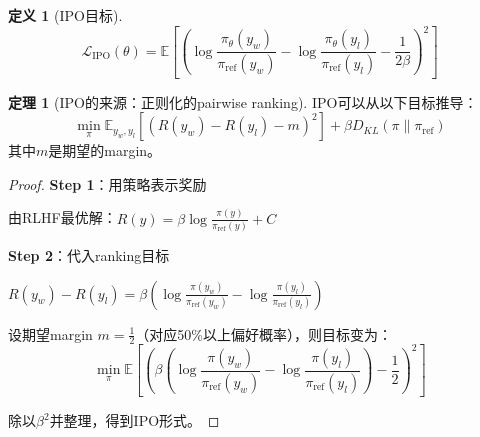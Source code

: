 \documentclass[11pt,a4paper]{article}
\theoremstyle{definition}
\newtheorem{definition}{定义}[section]
\newtheorem{theorem}{定理}[section]
\begin{document}
\begin{definition}[IPO目标]
\[
\mathcal{L}_{\text{IPO}}(\theta) = \mathbb{E}\left[\left(\log \frac{\pi_\theta(y_w)}{\pi_{\text{ref}}(y_w)} - \log \frac{\pi_\theta(y_l)}{\pi_{\text{ref}}(y_l)} - \frac{1}{2\beta}\right)^2\right]
\]
\end{definition}

\begin{theorem}[IPO的来源：正则化的pairwise ranking]
IPO可以从以下目标推导：
\[
\min_\pi \mathbb{E}_{y_w, y_l}\left[(R(y_w) - R(y_l) - m)^2\right] + \beta D_{KL}(\pi \| \pi_{\text{ref}})
\]
其中$m$是期望的margin。
\end{theorem}

\begin{proof}
\textbf{Step 1}：用策略表示奖励

由RLHF最优解：$R(y) = \beta \log \frac{\pi(y)}{\pi_{\text{ref}}(y)} + C$

\textbf{Step 2}：代入ranking目标

$R(y_w) - R(y_l) = \beta \left(\log \frac{\pi(y_w)}{\pi_{\text{ref}}(y_w)} - \log \frac{\pi(y_l)}{\pi_{\text{ref}}(y_l)}\right)$

设期望margin $m = \frac{1}{2}$（对应50\%以上偏好概率），则目标变为：
\[
\min_\pi \mathbb{E}\left[\left(\beta \left(\log \frac{\pi(y_w)}{\pi_{\text{ref}}(y_w)} - \log \frac{\pi(y_l)}{\pi_{\text{ref}}(y_l)}\right) - \frac{1}{2}\right)^2\right]
\]

除以$\beta^2$并整理，得到IPO形式。
\end{proof}
\end{document}
